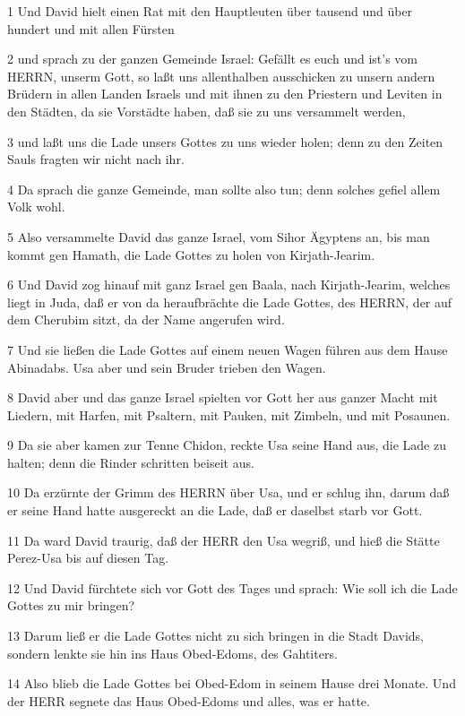 \par 1 Und David hielt einen Rat mit den Hauptleuten über tausend und über hundert und mit allen Fürsten
\par 2 und sprach zu der ganzen Gemeinde Israel: Gefällt es euch und ist's vom HERRN, unserm Gott, so laßt uns allenthalben ausschicken zu unsern andern Brüdern in allen Landen Israels und mit ihnen zu den Priestern und Leviten in den Städten, da sie Vorstädte haben, daß sie zu uns versammelt werden,
\par 3 und laßt uns die Lade unsers Gottes zu uns wieder holen; denn zu den Zeiten Sauls fragten wir nicht nach ihr.
\par 4 Da sprach die ganze Gemeinde, man sollte also tun; denn solches gefiel allem Volk wohl.
\par 5 Also versammelte David das ganze Israel, vom Sihor Ägyptens an, bis man kommt gen Hamath, die Lade Gottes zu holen von Kirjath-Jearim.
\par 6 Und David zog hinauf mit ganz Israel gen Baala, nach Kirjath-Jearim, welches liegt in Juda, daß er von da heraufbrächte die Lade Gottes, des HERRN, der auf dem Cherubim sitzt, da der Name angerufen wird.
\par 7 Und sie ließen die Lade Gottes auf einem neuen Wagen führen aus dem Hause Abinadabs. Usa aber und sein Bruder trieben den Wagen.
\par 8 David aber und das ganze Israel spielten vor Gott her aus ganzer Macht mit Liedern, mit Harfen, mit Psaltern, mit Pauken, mit Zimbeln, und mit Posaunen.
\par 9 Da sie aber kamen zur Tenne Chidon, reckte Usa seine Hand aus, die Lade zu halten; denn die Rinder schritten beiseit aus.
\par 10 Da erzürnte der Grimm des HERRN über Usa, und er schlug ihn, darum daß er seine Hand hatte ausgereckt an die Lade, daß er daselbst starb vor Gott.
\par 11 Da ward David traurig, daß der HERR den Usa wegriß, und hieß die Stätte Perez-Usa bis auf diesen Tag.
\par 12 Und David fürchtete sich vor Gott des Tages und sprach: Wie soll ich die Lade Gottes zu mir bringen?
\par 13 Darum ließ er die Lade Gottes nicht zu sich bringen in die Stadt Davids, sondern lenkte sie hin ins Haus Obed-Edoms, des Gahtiters.
\par 14 Also blieb die Lade Gottes bei Obed-Edom in seinem Hause drei Monate. Und der HERR segnete das Haus Obed-Edoms und alles, was er hatte.

